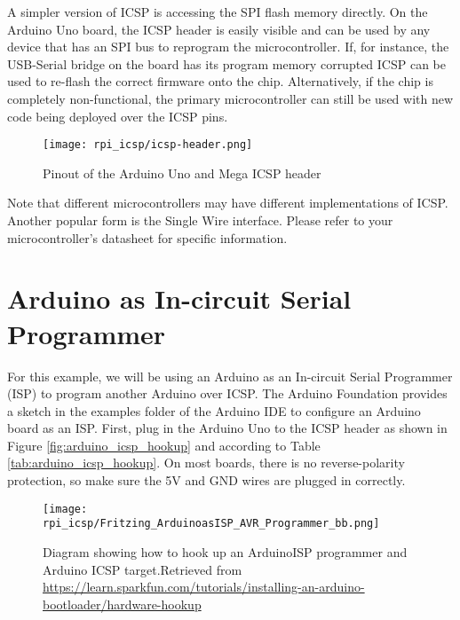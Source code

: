 A simpler version of ICSP is accessing the SPI flash memory directly. On the Arduino Uno board, the ICSP header is 
easily visible and can be used by any device that has an SPI bus to reprogram the microcontroller. 
If, for instance, the USB-Serial bridge on the board has its program memory corrupted ICSP can be used to re-flash the 
correct firmware onto the chip. Alternatively, if the chip is completely non-functional, the primary microcontroller 
can still be used with new code being deployed over the ICSP pins.

\begin{figure}
    \texttt{[image: rpi\_icsp/icsp-header.png]}
    \caption[Arduino ICSP Header]{Pinout of the Arduino Uno and Mega ICSP header}
\end{figure}

Note that different microcontrollers may have different implementations of ICSP. Another popular form is the Single
Wire interface. Please refer to your microcontroller's datasheet for specific information.

\section*{Arduino as In-circuit Serial Programmer}

For this example, we will be using an Arduino as an In-circuit Serial Programmer (ISP) to program another Arduino over 
ICSP. The Arduino Foundation provides a sketch in the examples folder of the Arduino IDE to configure an Arduino board 
as an ISP. First, plug in the Arduino Uno to the ICSP header as shown in Figure \ref{fig:arduino_icsp_hookup} and according to Table \ref{tab:arduino_icsp_hookup}. On most boards, there is no reverse-polarity protection, so make sure the 5V and GND wires are plugged in correctly. 

\begin{figure}
    \texttt{[image: rpi\_icsp/Fritzing\_ArduinoasISP\_AVR\_Programmer\_bb.png]}
    \caption[ArduinoISP Hookup Diagram]{Diagram showing how to hook up an ArduinoISP programmer and Arduino ICSP target.Retrieved from \url{https://learn.sparkfun.com/tutorials/installing-an-arduino-bootloader/hardware-hookup}}
\end{figure}

